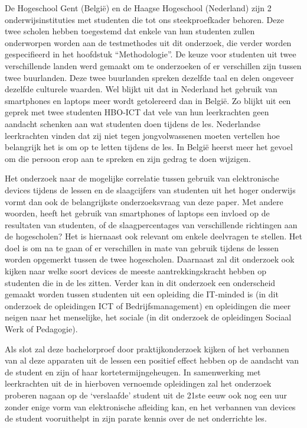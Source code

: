 De Hogeschool Gent (België) en de Haagse Hogeschool (Nederland) zijn 2 onderwijsinstituties met studenten die tot ons steekproefkader behoren. Deze twee scholen hebben toegestemd dat enkele van hun studenten zullen onderworpen worden aan de testmethodes uit dit onderzoek, die verder worden gespecifieerd in het hoofdstuk “Methodologie”. De keuze voor studenten uit twee verschillende landen werd gemaakt om te onderzoeken of er verschillen zijn tussen twee buurlanden. Deze twee buurlanden spreken dezelfde taal en delen ongeveer dezelfde culturele waarden. Wel blijkt uit \textcite{VanGaalen2017} dat in Nederland het gebruik van smartphones en laptops meer wordt getolereerd dan in België. Zo blijkt uit een geprek met twee studenten HBO-ICT dat vele van hun leerkrachten geen aandacht schenken aan wat studenten doen tijdens de les. Nederlandse leerkrachten vinden dat zij niet tegen jongvolwassenen moeten vertellen hoe belangrijk het is om op te letten tijdens de les. In België heerst meer het gevoel om die persoon erop aan te spreken en zijn gedrag te doen wijzigen.

Het onderzoek naar de mogelijke correlatie tussen gebruik van elektronische devices tijdens de lessen en de slaagcijfers van studenten uit het hoger onderwijs vormt dan ook de belangrijkste onderzoeksvraag van deze paper. Met andere woorden, heeft het gebruik van smartphones of laptops een invloed op de resultaten van studenten, of de slaagpercentages van verschillende richtingen aan de hogescholen? Het is hiernaast ook relevant om enkele deelvragen te stellen. Het doel is om na te gaan of er verschillen in mate van gebruik tijdens de lessen worden opgemerkt tussen de twee hogescholen. Daarnaast zal dit onderzoek ook kijken naar welke soort devices de meeste aantrekkingskracht hebben op studenten die in de les zitten. Verder kan in dit onderzoek een onderscheid gemaakt worden tussen studenten uit een opleiding die IT-minded is (in dit onderzoek de opleidingen ICT of Bedrijfsmanagement) en opleidingen die meer neigen naar het menselijke, het sociale (in dit onderzoek de opleidingen Sociaal Werk of Pedagogie).

Als slot zal deze bachelorproef door praktijkonderzoek kijken of het verbannen van al deze apparaten uit de lessen een positief effect hebben op de aandacht van de student en zijn of haar kortetermijngeheugen. In samenwerking met leerkrachten uit de in hierboven vernoemde opleidingen zal het onderzoek proberen nagaan op de ‘verslaafde’ student uit de 21ste eeuw ook nog een uur zonder enige vorm van elektronische afleiding kan, en het verbannen van devices de student vooruithelpt in zijn parate kennis over de net onderrichte les.

